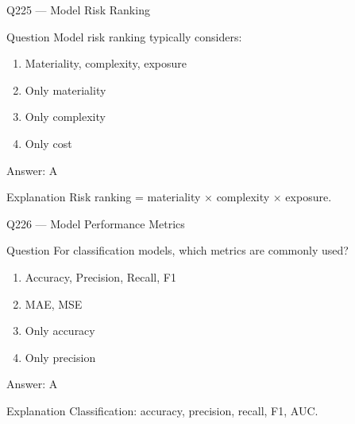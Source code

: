 \documentclass[aspectratio=169,8pt]{beamer}
\begin{document}
								\begin{frame}{Q225 --- Model Risk Ranking}
									\begin{block}{Question}
										Model risk ranking typically considers:
										\begin{enumerate}
											\item Materiality, complexity, exposure
											\item Only materiality
											\item Only complexity
											\item Only cost
										\end{enumerate}
									\end{block}
									\begin{exampleblock}{Answer: A}\end{exampleblock}
									\begin{block}{Explanation}
										Risk ranking = materiality × complexity × exposure.
									\end{block}
								\end{frame}
								
								\begin{frame}{Q226 --- Model Performance Metrics}
									\begin{block}{Question}
										For classification models, which metrics are commonly used?
										\begin{enumerate}
											\item Accuracy, Precision, Recall, F1
											\item MAE, MSE
											\item Only accuracy
											\item Only precision
										\end{enumerate}
									\end{block}
									\begin{exampleblock}{Answer: A}\end{exampleblock}
									\begin{block}{Explanation}
										Classification: accuracy, precision, recall, F1, AUC.
									\end{block}
								\end{frame}
								
\end{document}
